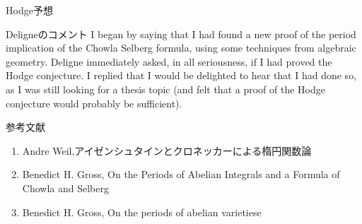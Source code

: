 \documentclass[dvipdfmx,aspectratio=169]{beamer}
\begin{document}
\begin{frame}{Hodge予想}
\begin{block}{Deligneのコメント}
I began by saying that I had found a new proof of the period implication of the Chowla Selberg formula, using some techniques from algebraic geometry. Deligne immediately asked, in all seriousness, if I had proved the Hodge conjecture. I replied that I would be delighted to hear that I had done so, as I was still looking for a thesis topic (and felt that a proof of the Hodge conjecture would probably be sufficient).
\end{block}
\end{frame}

\begin{frame}{参考文献}
\begin{enumerate}
\item Andre Weil,アイゼンシュタインとクロネッカーによる楕円関数論
\item Benedict H. Gross, On the Periods of Abelian Integrals and a Formula of Chowla and Selberg
\item Benedict H. Gross, On the periods of abelian varietiese
\end{enumerate}
\end{frame}
\end{document}
